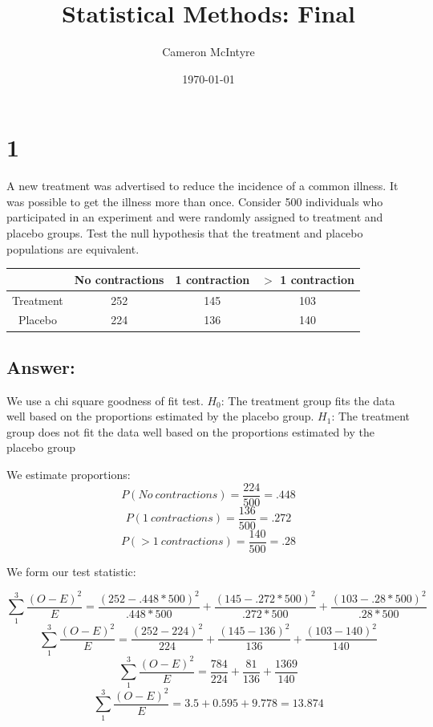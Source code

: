 \documentclass[svgnames]{article}
\title{Statistical Methods: Final}
\author{Cameron McIntyre}
\date{\today}
\begin{document}
\maketitle

\section*{1}
A new treatment was advertised to reduce the incidence of a common illness. It was possible to get the illness more than once. Consider 500 individuals who participated in an experiment and were randomly assigned to treatment and placebo groups. Test the null hypothesis that the treatment and placebo populations are equivalent.

\begin{center}
\begin{tabular}{| c | c | c | c |} 
\hline
& No contractions & 1 contraction & $>$ 1 contraction \\
\hline
Treatment & 252 & 145 & 103 \\
\hline
Placebo & 224 & 136 & 140 \\
\hline
\end{tabular}
\end{center}

\subsection*{Answer:}

We use a chi square goodness of fit test. 
$H_0$: The treatment group fits the data well based on the proportions estimated by the placebo group.
\newline
$H_1$: The treatment group does not fit the data well based on the proportions estimated by the placebo group
\newline

We estimate proportions:
$$P(No\ contractions) = \frac{224}{500}=.448$$
$$P(1\ contractions) = \frac{136}{500}=.272$$
$$P(>1\ contractions) = \frac{140}{500}=.28$$

We form our test statistic:

$$\sum^{3}_{1} \frac{(O-E)^2}{E}=\frac{(252-.448*500)^2}{.448*500}+\frac{(145-.272*500)^2}{.272*500}+\frac{(103-.28*500)^2}{.28*500}$$
$$\sum^{3}_{1} \frac{(O-E)^2}{E}=\frac{(252-224)^2}{224}+\frac{(145-136)^2}{136}+\frac{(103-140)^2}{140}$$
$$\sum^{3}_{1} \frac{(O-E)^2}{E}=\frac{784}{224}+\frac{81}{136}+\frac{1369}{140}$$
$$\sum^{3}_{1} \frac{(O-E)^2}{E}=3.5 + 0.595+ 9.778= 13.874$$
\end{document}
